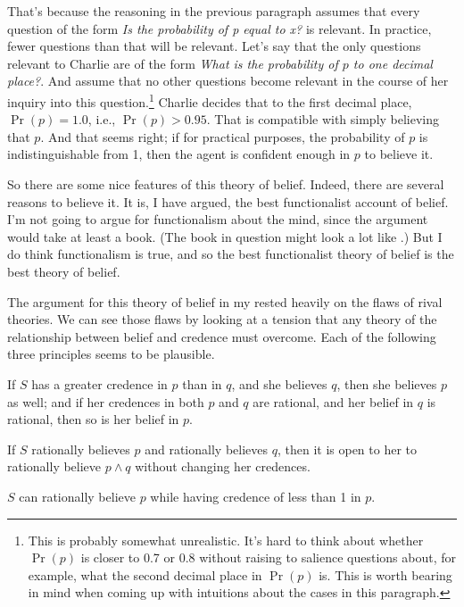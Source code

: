 That's because the reasoning in the previous paragraph assumes that every question of the form \textit{Is the probability of p equal to x?} is relevant. In practice, fewer questions than that will be relevant. Let's say that the only questions relevant to Charlie are of the form \textit{What is the probability of $p$ to one decimal place?}. And assume that no other questions become relevant in the course of her inquiry into this question.\footnote{This is probably somewhat unrealistic. It's hard to think about whether $\Pr(p)$ is closer to 0.7 or 0.8 without raising to salience questions about, for example, what the second decimal place in $\Pr(p)$ is. This is worth bearing in mind when coming up with intuitions about the cases in this paragraph.} Charlie decides that to the first decimal place, $\Pr(p) = 1.0$, i.e., $\Pr(p) > 0.95$. That is compatible with simply believing that $p$. And that seems right; if for practical purposes, the probability of $p$ is indistinguishable from 1, then the agent is confident enough in $p$ to believe it.

So there are some nice features of this theory of belief. Indeed, there are several reasons to believe it. It is, I have argued, the best functionalist account of belief. I'm not going to argue for functionalism about the mind, since the argument would take at least a book. (The book in question might look a lot like \cite{DBMJackson2007}.) But I do think functionalism is true, and so the best functionalist theory of belief is the best theory of belief.

The argument for this theory of belief in my  \citeyearpar{Weatherson2005-WEACWD} rested heavily on the flaws of rival theories. We can see those flaws by looking at a tension that any theory of the relationship between belief and credence must overcome. Each of the following three principles seems to be plausible.

\begin{enumerate*}
\item If $S$ has a greater credence in $p$ than in $q$, and she believes $q$, then she believes $p$ as well; and if her credences in both $p$ and $q$ are rational, and her belief in $q$ is rational, then so is her belief in $p$.
\item If $S$ rationally believes $p$ and rationally believes $q$, then it is open to her to rationally believe $p \wedge q$ without changing her credences.
\item $S$ can rationally believe $p$ while having credence of less than 1 in $p$.
\end{enumerate*}

